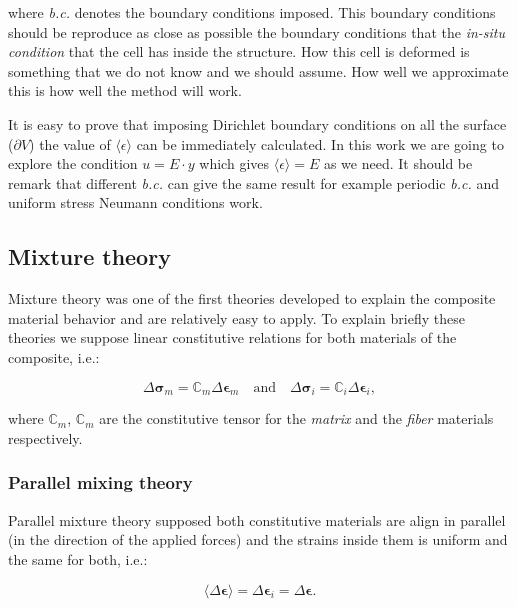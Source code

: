 \documentclass[review]{elsarticle}
\begin{document}
\noindent
where \emph{b.c.} denotes the boundary conditions imposed. This boundary
conditions should be reproduce as close as possible the boundary conditions that
the  \emph{in-situ condition} that the cell has inside the structure. How this
cell is deformed is something that we do not know and we should assume. How well
we approximate this is how well the method will work.

It is easy to prove that imposing Dirichlet boundary conditions on all the
surface ($\partial V$) the value of $\langle \epsilon \rangle$ can be
immediately calculated. In this work we are going to explore the condition 
$ u = E \cdot y $ which gives $\langle \epsilon \rangle = E$ as we need. It
should be remark that different \emph{b.c.} can give the same result for example 
periodic \emph{b.c.} and uniform stress Neumann conditions work.

\subsection{Mixture theory}

Mixture theory was one of the first theories developed to explain the composite
material behavior and are relatively easy to apply. 
To explain briefly these theories we suppose linear constitutive relations for 
both materials of the composite, i.e.:

\begin{equation}
\Delta \bm{\sigma}_m = \mathbb{C}_m  \Delta \bm{\epsilon}_m 
\quad\text{and}\quad 
\Delta \bm{\sigma}_i = \mathbb{C}_i  \Delta \bm{\epsilon}_i,
\label{eq:const_im}
\end{equation}

\noindent
where $\mathbb{C}_m$, $\mathbb{C}_m$ are the constitutive tensor for the
\emph{matrix} and the \emph{fiber} materials respectively.

\subsubsection{Parallel mixing theory}

Parallel mixture theory supposed both constitutive materials are align in parallel (in the
direction of the applied forces) and the
strains inside them is uniform and the same for both, i.e.:

\begin{equation}
\langle\Delta \bm{\epsilon}\rangle = \Delta \bm{\epsilon}_i = \Delta \bm{\epsilon}.
\end{equation}
\end{document}
